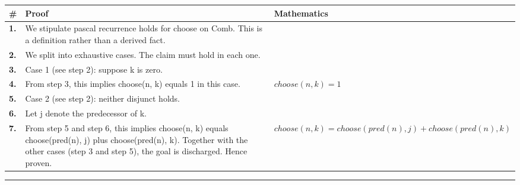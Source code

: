\documentclass[11pt]{article}
\theoremstyle{definition}
\begin{document}
\medskip
\noindent
\begin{tabular}{@{} >{\raggedright\arraybackslash}p{} >{\raggedright\arraybackslash}p{} >{\raggedleft\arraybackslash}p{} @{}}
\textbf{\#} & \textbf{Proof} & \textbf{Mathematics} \\
\midrule
\textbf{1.} & We stipulate pascal recurrence holds for choose on Comb. This is a definition rather than a derived fact. & \\[0.45em]
\textbf{2.} & We split into exhaustive cases. The claim must hold in each one. & \\[0.45em]
\textbf{3.} & Case 1 (see step 2): suppose k is zero. & \\[0.45em]
\textbf{4.} & From step 3, this implies choose(n, k) equals 1 in this case. & $\displaystyle choose(n, k) = 1$ \\[0.45em]
\textbf{5.} & Case 2 (see step 2): neither disjunct holds. & \\[0.45em]
\textbf{6.} & Let j denote the predecessor of k. & \\[0.45em]
\textbf{7.} & From step 5 and step 6, this implies choose(n, k) equals choose(pred(n), j) plus choose(pred(n), k). Together with the other cases (step 3 and step 5), the goal is discharged. Hence proven. & $\displaystyle choose(n, k) = choose(pred(n), j) + choose(pred(n), k)$ \\[0.45em]
\bottomrule
\end{tabular}
\label{thm:Comb-choose-pascal_recurrence_holds}
\par\medskip\hrule
\end{document}
